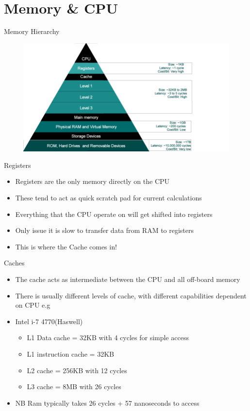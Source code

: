 \part{Memory \& CPU}
\frame{\partpage}

\begin{frame}{Memory Hierarchy}
\begin{figure}
	\includegraphics[width=1.0\textwidth,height=0.8\textheight]{Memory-hierarchy}  
\end{figure}
\end{frame}

\begin{frame}{Registers}
	\begin{itemize}
		\pause \item Registers are the only memory directly on the CPU
		\pause \item These tend to act as quick scratch pad for current calculations
		\pause \item Everything that the CPU operate on will get shifted into registers
		\pause \item Only issue it is slow to transfer data from RAM to registers
		\pause \item This is where the Cache comes in!  
	\end{itemize}
\end{frame}

\begin{frame}{Caches}
	\begin{itemize}
		\pause \item The cache acts as intermediate between the CPU and all off-board memory
		\pause \item There is usually different levels of cache, with different capabilities dependent on CPU e.g
		\pause \item Intel i-7 4770(Haswell)
		\begin{itemize}
			\pause \item L1 Data cache = 32KB with 4 cycles for simple access
			\pause \item L1 instruction cache = 32KB
			\pause \item L2 cache = 256KB with 12 cycles
			\pause \item L3 cache = 8MB with 26 cycles
		\end{itemize}
		\pause \item NB Ram typically takes 26 cycles + 57 nanoseconds to access 
	\end{itemize}
\end{frame}

